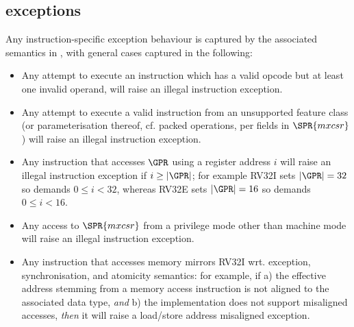 \subsection{\XCRYPTO exceptions}
\label{sec:spec:exceptions}


Any instruction-specific exception behaviour is captured by the associated
semantics in , with general cases captured in
the following:

\begin{itemize}
\item Any attempt to execute an \XCRYPTO instruction which
      has a    valid opcode but at least one invalid operand,
      will raise an 
      illegal instruction exception.
\item Any attempt to execute a
        valid \XCRYPTO instruction
      from an unsupported feature class (or parameterisation thereof, cf. packed operations, per fields in $\SPR{mxcsr}$)
      will raise an 
      illegal instruction exception.
\item Any instruction that accesses $\GPR$ using a register address $i$ 
      will raise an
      illegal instruction exception
      if $i \geq |\GPR|$; for example
      RV32I sets $|\GPR| = 32$ so demands $0 \leq i < 32$,
      whereas
      RV32E sets $|\GPR| = 16$ so demands $0 \leq i < 16$.
\item Any access to
      $\SPR{mxcsr}$
      from a privilege mode other than machine mode
      will raise an 
      illegal instruction exception.
\item Any instruction that accesses memory mirrors RV32I wrt. exception,
      synchronisation, and atomicity semantics: for example, if
      a) the effective address stemming from a memory access instruction
         is not aligned to the associated data type, 
         {\em  and}
      b) the implementation does not support misaligned accesses,
         {\em then} it 
      will raise a 
      load/store address misaligned exception.
\end{itemize}


